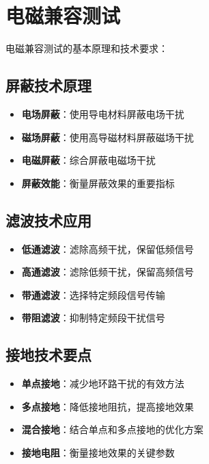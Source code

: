 \documentclass[12pt,UTF8]{ctexbook}
\begin{document}
\section{电磁兼容测试}

电磁兼容测试的基本原理和技术要求：

\subsection{屏蔽技术原理}

\begin{itemize}[leftmargin=3.5em]
    \item \textbf{电场屏蔽}：使用导电材料屏蔽电场干扰
    \item \textbf{磁场屏蔽}：使用高导磁材料屏蔽磁场干扰
    \item \textbf{电磁屏蔽}：综合屏蔽电磁场干扰
    \item \textbf{屏蔽效能}：衡量屏蔽效果的重要指标
\end{itemize}

\subsection{滤波技术应用}

\begin{itemize}[leftmargin=3.5em]
    \item \textbf{低通滤波}：滤除高频干扰，保留低频信号
    \item \textbf{高通滤波}：滤除低频干扰，保留高频信号
    \item \textbf{带通滤波}：选择特定频段信号传输
    \item \textbf{带阻滤波}：抑制特定频段干扰信号
\end{itemize}

\subsection{接地技术要点}

\begin{itemize}[leftmargin=3.5em]
    \item \textbf{单点接地}：减少地环路干扰的有效方法
    \item \textbf{多点接地}：降低接地阻抗，提高接地效果
    \item \textbf{混合接地}：结合单点和多点接地的优化方案
    \item \textbf{接地电阻}：衡量接地效果的关键参数
\end{itemize}
\end{document}
